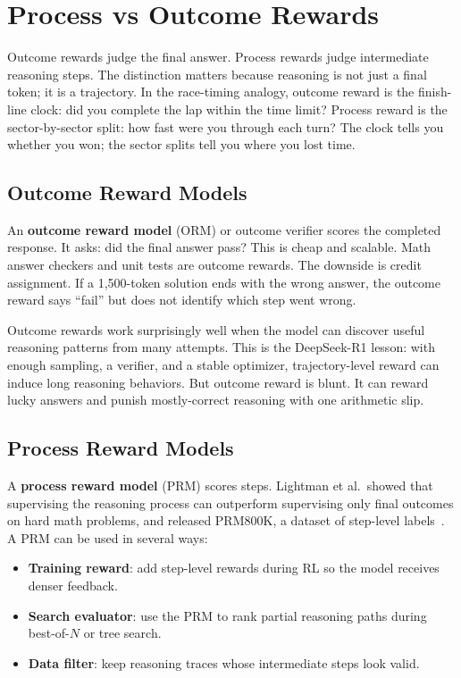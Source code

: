 \section{Process vs Outcome Rewards}
\label{sec:process-outcome}

Outcome rewards judge the final answer. Process rewards judge intermediate reasoning steps. The distinction matters because reasoning is not just a final token; it is a trajectory. In the race-timing analogy, outcome reward is the finish-line clock: did you complete the lap within the time limit? Process reward is the sector-by-sector split: how fast were you through each turn? The clock tells you whether you won; the sector splits tell you where you lost time.

\subsection{Outcome Reward Models}

An \textbf{outcome reward model} (ORM) or outcome verifier scores the completed response. It asks: did the final answer pass? This is cheap and scalable. Math answer checkers and unit tests are outcome rewards. The downside is credit assignment. If a 1{,}500-token solution ends with the wrong answer, the outcome reward says ``fail'' but does not identify which step went wrong.

Outcome rewards work surprisingly well when the model can discover useful reasoning patterns from many attempts. This is the DeepSeek-R1 lesson: with enough sampling, a verifier, and a stable optimizer, trajectory-level reward can induce long reasoning behaviors. But outcome reward is blunt. It can reward lucky answers and punish mostly-correct reasoning with one arithmetic slip.

\subsection{Process Reward Models}

A \textbf{process reward model} (PRM) scores steps. Lightman et al.\ showed that supervising the reasoning process can outperform supervising only final outcomes on hard math problems, and released PRM800K, a dataset of step-level labels~\cite{lightman2023verify}. A PRM can be used in several ways:

\begin{itemize}[nosep]
  \item \textbf{Training reward}: add step-level rewards during RL so the model receives denser feedback.
  \item \textbf{Search evaluator}: use the PRM to rank partial reasoning paths during best-of-$N$ or tree search.
  \item \textbf{Data filter}: keep reasoning traces whose intermediate steps look valid.
\end{itemize}

